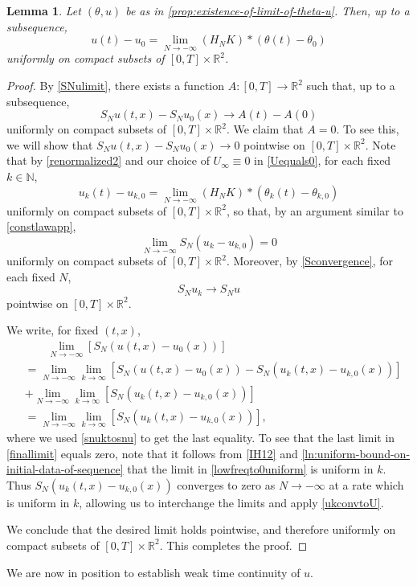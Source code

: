 \documentclass[11pt,reqno,xcolor=svgnames]{amsart}
\def\R{{\mathbb R}}
\def\N{{\mathbb N}}
\theoremstyle{plain}
\newtheorem{lemma}[theorem]{Lemma}
\theoremstyle{definition}
\theoremstyle{plain}
\theoremstyle{remark}
\begin{document}
\begin{lemma}\label{nablasntozerolemma}
Let $(\theta, u)$ be as in \cref{prop:existence-of-limit-of-theta-u}.  Then, up to a subsequence,  
$$ u(t) - u_0 = \lim_{N\rightarrow -\infty} (H_NK) \ast (\theta(t) - \theta_0)  $$
uniformly on compact subsets of $[0,T]\times \R^2$.
\end{lemma}
\begin{proof}
 By \cref{SNulimit}, there exists a function $A:[0,T]\rightarrow\R^2$ such that, up to a subsequence,
 $$S_N u(t,x) - S_N u_0(x)  \rightarrow A(t) - A(0)$$
 uniformly on compact subsets of $[0,T]\times \R^2$.  We claim that $A=0$.  To see this, we will show that $ S_N u(t,x) - S_N u_0(x)  \rightarrow 0$ pointwise on $[0,T]\times\R^2$.  
Note that by \cref{renormalized2} and our choice of $U_{\infty}\equiv 0$ in \cref{Uequals0}, for each fixed $k\in\N$,
\begin{equation}\label{conv1} u_k(t) - u_{k,0} = \lim_{N\rightarrow -\infty} (H_NK) \ast (\theta_k(t) - \theta_{k,0})
\end{equation}
uniformly on compact subsets of $[0,T]\times\R^2$, so that, by an argument similar to \cref{constlawapp}, 
\begin{equation}\label{ukconvtoU} \lim_{N\rightarrow -\infty } S_N (u_k - u_{k,0}) = 0
\end{equation}
uniformly on compact subsets of $[0,T]\times\R^2$.  Moreover, by \cref{Sconvergence}, for each fixed $N$, 
\begin{equation}\label{snuktosnu} S_N u_k \rightarrow S_N u 
\end{equation}
pointwise on $[0,T]\times\R^2$.


We write, for fixed $(t,x)$,
\begin{equation}\label{finallimit}
\begin{split}
&\qquad \lim_{N\rightarrow -\infty} [S_N( u(t,x) - u_0(x)) ]\\
& = \lim_{N\rightarrow -\infty}\lim_{k\rightarrow \infty}[S_N( u(t,x) - u_0(x)) - S_N( u_k(t,x) - u_{k,0}(x))] \\
&  +\lim_{N\rightarrow -\infty}\lim_{k\rightarrow \infty}  [S_N( u_k(t,x) - u_{k,0}(x)) ]\\
& = \lim_{N\rightarrow -\infty}\lim_{k\rightarrow \infty}  [S_N( u_k(t,x) - u_{k,0}(x)) ],
\end{split}
\end{equation}
where we used \cref{snuktosnu} to get the last equality.  To see that the last limit in \cref{finallimit} equals zero, note that it follows from \cref{IH12} and \cref{ln:uniform-bound-on-initial-data-of-sequence} that the limit in \cref{lowfreqto0uniform} is uniform in $k$.  Thus $S_N( u_k(t,x) - u_{k,0}(x)) $ converges to zero as $N\rightarrow -\infty$ at a rate which is uniform in $k$, allowing us to interchange the limits and apply \cref{ukconvtoU}.

We conclude that the desired limit holds pointwise, and therefore uniformly on compact subsets of $[0,T]\times \R^2$.  This completes the proof.
\end{proof}
We are now in position to establish weak time continuity of $u$.
\end{document}
